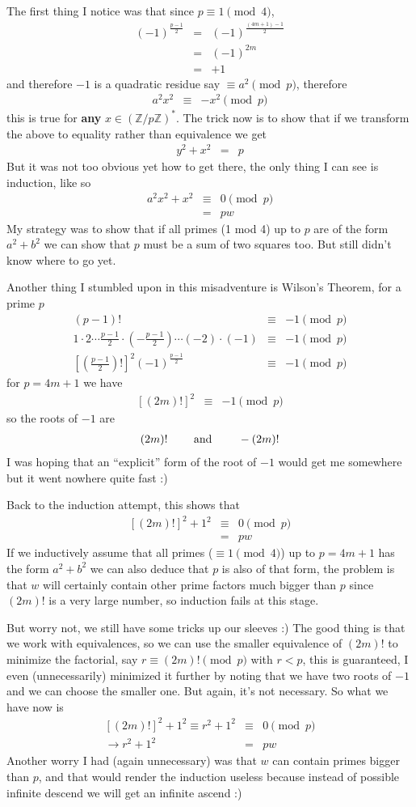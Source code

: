 \documentclass[aps,preprint,preprintnumbers,nofootinbib,showpacs,prd]{revtex4-1}
\newcommand{\nbea}{\begin{eqnarray*}}
\newcommand{\neea}{\end{eqnarray*}}
\begin{document}
The first thing I notice was that since $p \equiv 1 \pmod{4}$,
%
\nbea
(-1)^{\frac{p-1}{2}} & = & (-1)^{\frac{(4m+1)-1}{2}} \\
& = & (-1)^{2m} \\
& = & +1
\neea
%
and therefore $-1$ is a quadratic residue say $\equiv a^2 \pmod{p}$, therefore
%
\nbea
a^2 x^2 & \equiv & -x^2 \pmod{p}
\neea
%
this is true for {\bf any} $x \in (\mathbb{Z}/p\mathbb{Z})^*$. The trick now is to show that if we transform the above to equality rather than equivalence we get 
%
\nbea
y^2 + x^2 & = & p
\neea
%
But it was not too obvious yet how to get there, the only thing I can see is induction, like so
%
\nbea
a^2x^2 + x^2 & \equiv & 0 \pmod{p} \\
& = & pw
\neea
%
My strategy was to show that if all primes (1 mod 4) up to $p$ are of the form $a^2 + b^2$ we can show that $p$ must be a sum of two squares too. But still didn't know where to go yet.

Another thing I stumbled upon in this misadventure is Wilson's Theorem, for a prime $p$
%
\nbea
(p-1)! & \equiv & -1 \pmod{p} \\
1\cdot2\cdots \frac{p-1}{2} \cdot \left(-\frac{p-1}{2}\right) \cdots (-2)\cdot (-1) & \equiv & -1 \pmod{p} \\
\left \lbrack\left ( \frac{p-1}{2} \right ) ! \right \rbrack^2 (-1)^{\frac{p-1}{2}} & \equiv & -1 \pmod{p}
\neea
%
for $p = 4m+1$ we have
%
\nbea
\left \lbrack\left ( 2m \right ) ! \right \rbrack^2 & \equiv & -1 \pmod{p}
\neea
%
so the roots of $-1$ are
%
\nbea
\left ( 2m \right ) ! ~~~~~~~{\rm and} ~~~~~~~ -\left ( 2m \right ) !
\neea
%
I was hoping that an ``explicit'' form of the root of $-1$ would get me somewhere but it went nowhere quite fast :)

Back to the induction attempt, this shows that
%
\nbea
\left \lbrack\left ( 2m \right ) ! \right \rbrack^2 + 1^2 & \equiv & 0 \pmod{p} \\
& = & pw
\neea
%
If we inductively assume that all primes ($\equiv 1 \pmod{4}$) up to $p = 4m+1$ has the form $a^2 + b^2$ we can also deduce that $p$ is also of that form, the problem is that $w$ will certainly contain other prime factors much bigger than $p$ since $(2m)!$ is a very large number, so induction fails at this stage.

But worry not, we still have some tricks up our sleeves :) The good thing is that we work with equivalences, so we can use the smaller equivalence of $(2m)!$ to minimize the factorial, say $r \equiv (2m)! \pmod{p}$ with $r < p$, this is guaranteed, I even (unnecessarily) minimized it further by noting that we have two roots of $-1$ and we can choose the smaller one. But again, it's not necessary. So what we have now is
%
\nbea
\left \lbrack\left ( 2m \right ) ! \right \rbrack^2 + 1^2 \equiv r^2 + 1^2 & \equiv & 0 \pmod{p} \\
\to r^2 + 1^2 & = & pw
\neea
%
Another worry I had (again unnecessary) was that $w$ can contain primes bigger than $p$, and that would render the induction useless because instead of possible infinite descend we will get an infinite ascend :)
\end{document}
